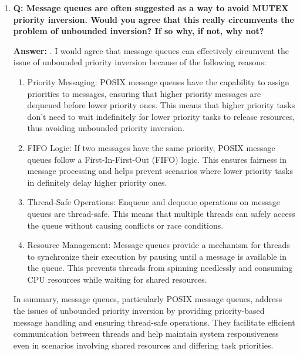 \documentclass[a4paper,11pt]{article}%
\newenvironment{qanda}{\setlength{\parindent}{0pt}}{\bigskip}
\newcommand{\Q}{\bigskip\bfseries Q: }
\newcommand{\A}{\par\textbf{Answer: } \normalfont}
\begin{document}
\begin{qanda}
\begin{enumerate}
\begin{enumerate}
				\item \Q Message queues are often suggested as a way to avoid MUTEX priority inversion.
				      Would you agree that this really circumvents the problem of unbounded inversion? If so
				      why, if not, why not?
				      \A . I would agree that message queues can effectively circumvent the issue of unbounded priority inversion because of the following reasons:
					  \begin{enumerate}
						\item[] Priority Messaging: POSIX message queues have the capability to assign priorities to messages, ensuring that higher priority messages are dequeued before lower priority ones. This means that higher priority tasks don't need to wait indefinitely for lower priority tasks to release resources, thus avoiding unbounded priority inversion.
						\item[] FIFO Logic: If two messages have the same priority, POSIX message queues follow a First-In-First-Out (FIFO) logic. This ensures fairness in message processing and helps prevent scenarios where lower priority tasks in definitely delay higher priority ones.
						\item[] Thread-Safe Operations: Enqueue and dequeue operations on message queues are thread-safe. This means that multiple threads can safely access the queue without causing conflicts or race conditions.
						\item[] Resource Management: Message queues provide a mechanism for threads to synchronize their execution by pausing until a message is available in the queue. This prevents threads from spinning needlessly and consuming CPU resources while waiting for shared resources.
					  \end{enumerate}
				      
				      
				      
				      In summary, message queues, particularly POSIX message queues, address the issues of unbounded priority inversion by providing priority-based message handling and ensuring thread-safe operations. They facilitate efficient communication between threads and help maintain system responsiveness even in scenarios involving shared resources and differing task priorities.

			\end{enumerate}


	\end{enumerate}


\end{qanda}
\end{document}
